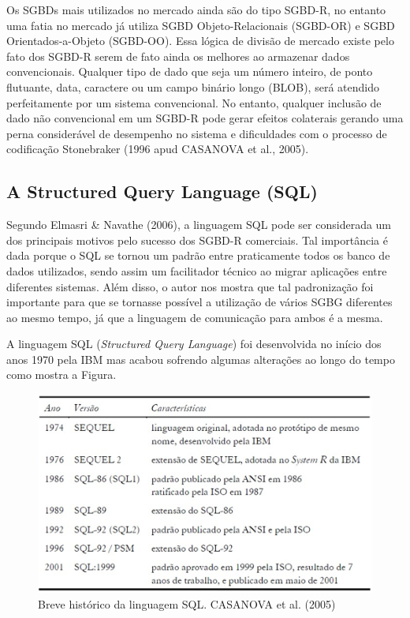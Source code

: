 		Os SGBDs mais utilizados no mercado ainda são do tipo SGBD-R, no entanto uma fatia no mercado já utiliza SGBD Objeto-Relacionais (SGBD-OR) e SGBD Orientados-a-Objeto (SGBD-OO). Essa lógica de divisão de mercado existe pelo fato dos SGBD-R serem de fato ainda os melhores ao armazenar dados convencionais. Qualquer tipo de dado que seja um número inteiro, de ponto flutuante, data, caractere ou um campo binário longo (BLOB), será atendido perfeitamente por um sistema convencional. No entanto, qualquer inclusão de dado não convencional em um SGBD-R pode gerar efeitos colaterais gerando uma perna considerável de desempenho no sistema e dificuldades com o processo de codificação Stonebraker (1996 apud CASANOVA et al., 2005).
		
		\subsection{A Structured Query Language (SQL)}
		
		Segundo Elmasri \& Navathe (2006), a linguagem SQL pode ser considerada um dos principais motivos pelo sucesso dos SGBD-R comerciais. Tal importância é dada porque o SQL se tornou um padrão entre praticamente todos os banco de dados utilizados, sendo assim um facilitador técnico ao migrar aplicações entre diferentes sistemas. Além disso, o autor nos mostra que tal padronização foi importante para que se tornasse possível a utilização de vários SGBG diferentes ao mesmo tempo, já que a linguagem de comunicação para ambos é a mesma.
		
		A linguagem SQL (\textit{Structured Query Language}) foi desenvolvida no início dos anos 1970 pela IBM mas acabou sofrendo algumas alterações ao longo do tempo como mostra a Figura.
		
		\begin{figure}
			\centering
			\includegraphics[width=1\linewidth]{data/sql_history}
			\caption{Breve histórico da linguagem SQL. CASANOVA et al. (2005)}
			\label{fig:sqlhistory}
		\end{figure}
		
